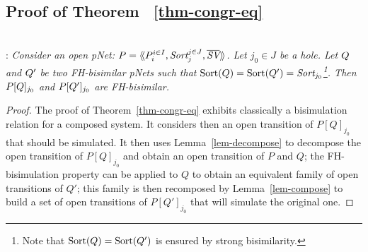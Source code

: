 \documentclass{lmcs}
\begin{document}
 \subsection{Proof of Theorem ~\ref{thm-congr-eq}}~\\
:
\textit{	Consider an open pNet:
	$\pNet = \mylangle \pNet_i^{i\in I}, \Sort_j^{j\in J}, 
	\set{\symb{SV}}\myrangle$.
	Let $j_0\in J$ be a hole. Let $Q$ and $Q'$ be two FH-bisimilar pNets such that 
	$\Sortop(\pNetQ)=\Sortop(\pNetQ')=\Sort_{j_0}$\footnote{Note that $\operatorname{Sort}(Q)=\operatorname{Sort}(Q')$ is 
	ensured by 
	strong bisimilarity.}. Then 
	$P[Q]_{j_0}$ and 
	$P[Q']_{j_0}$ are FH-bisimilar.
}
\medskip
\begin{proof}
 The proof of Theorem~\ref{thm-congr-eq} exhibits classically a bisimulation relation for 
 a 
 composed system.  It considers then an open transition of $P[Q]_{j_0}$ that should be 
 simulated. It then uses  Lemma~\ref{lem-decompose} to decompose the open transition 
 of $P[Q]_{j_0}$ and obtain an open transition of $P$ and $Q$; the FH-bisimulation 
 property can 
 be applied  to $Q$ to obtain an equivalent family of open transitions of $Q'$; this 
 family is 
 then recomposed by Lemma~\ref{lem-compose} to build a set of open transitions of 
 $P[Q']_{j_0}$ 
 that will simulate the original one.
 


\end{proof}
\end{document}
